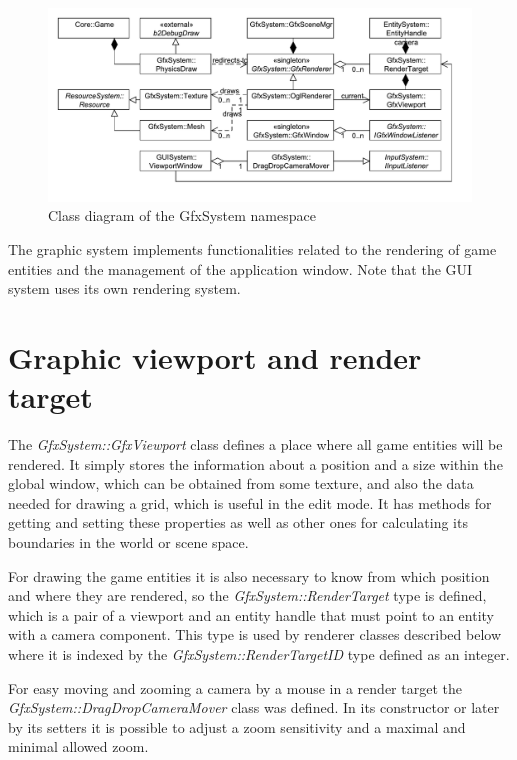 \documentclass[a4paper, 12pt]{report}
\begin{document}
\begin{figure}[htbp]
	\centering
		\includegraphics[width=1\textwidth]{GfxSystemClassDiagram.pdf}
	\caption{Class diagram of the GfxSystem namespace}
	\label{fig:gfxsystem-diagram}
\end{figure}

The graphic system implements functionalities related to the rendering of game entities and the management of the application window. Note that the GUI system uses its own rendering system.

\section{Graphic viewport and render target}
\label{sec:render-target}

The \emph{GfxSystem::GfxViewport} class defines a place where all game entities will be rendered. It simply stores the information about a position and a size within the global window, which can be obtained from some texture, and also the data needed for drawing a grid, which is useful in the edit mode. It has methods for getting and setting these properties as well as other ones for calculating its boundaries in the world or scene space.

For drawing the game entities it is also necessary to know from which position and where they are rendered, so the \emph{GfxSystem::RenderTarget} type is defined, which is a pair of a viewport and an entity handle that must point to an entity with a camera component. This type is used by renderer classes described below where it is indexed by the \emph{GfxSystem::RenderTargetID} type defined as an integer.

For easy moving and zooming a camera by a mouse in a render target the \emph{GfxSystem::DragDropCameraMover} class was defined. In its constructor or later by its setters it is possible to adjust a zoom sensitivity and a maximal and minimal allowed zoom.
\end{document}
